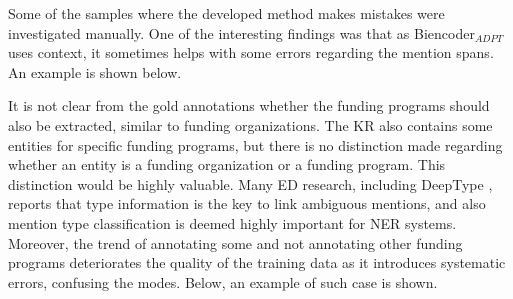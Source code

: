 \documentclass{report}
\theoremstyle{definition}
\theoremstyle{remark}
\begin{document}
Some of the samples where the developed method makes mistakes were investigated manually. One of the interesting findings was that as Biencoder$_{ADPT}$ uses context, it sometimes helps with some errors regarding the mention spans. An example is shown below.

\begin{center}
\end{center}

It is not clear from the gold annotations whether the funding programs should also be extracted, similar to funding organizations. The KR also contains some entities for specific funding programs, but there is no distinction made regarding whether an entity is a funding organization or a funding program. This distinction would be highly valuable. Many ED research, including DeepType \cite{raiman}, reports that type information is the key to link ambiguous mentions, and also mention type classification is deemed highly important for NER systems. Moreover, the trend of annotating some and not annotating other funding programs deteriorates the quality of the training data as it introduces systematic errors, confusing the modes. Below, an example of such case is shown.
\end{document}
